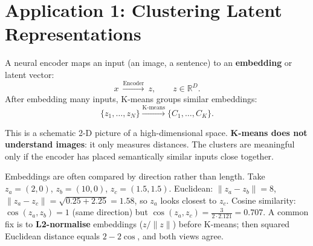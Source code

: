 \documentclass[11pt,a4paper]{article}
\begin{document}
\section{Application 1: Clustering Latent Representations}

A neural encoder maps an input (an image, a sentence) to an \textbf{embedding} or latent vector:
\[
x\ \xrightarrow{\text{Encoder}}\ z,\qquad z\in\mathbb{R}^D.
\]
After embedding many inputs, K-means groups similar embeddings:
\[
\{z_1,\dots,z_N\}\xrightarrow{\text{K-means}}\{C_1,\dots,C_K\}.
\]

\begin{center}
\end{center}
This is a schematic 2-D picture of a high-dimensional space. \textbf{K-means does not understand images}: it only measures distances. The clusters are meaningful only if the encoder has placed semantically similar inputs close together.

\begin{example}
Embeddings are often compared by direction rather than length. Take $z_a=(2,0)$, $z_b=(10,0)$, $z_c=(1.5,1.5)$. Euclidean: $\|z_a-z_b\|=8$, $\|z_a-z_c\|=\sqrt{0.25+2.25}=1.58$, so $z_a$ looks closest to $z_c$. Cosine similarity: $\cos(z_a,z_b)=1$ (same direction) but $\cos(z_a,z_c)=\frac{3}{2\cdot2.121}=0.707$. A common fix is to \textbf{L2-normalise} embeddings ($z/\|z\|$) before K-means; then squared Euclidean distance equals $2-2\cos$, and both views agree.
\end{example}
\end{document}

